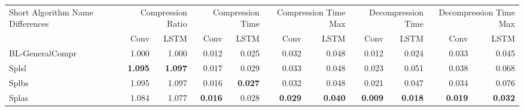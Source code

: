 \begin{tabular}{lrrrrrrrrrr}
\toprule
\multicolumn{1}{p{2.5cm}}{Short Algorithm Name Differences} & \multicolumn{2}{p{1.7cm}}{Compression Ratio} & \multicolumn{2}{p{1.7cm}}{Compression Time} & \multicolumn{2}{p{1.7cm}}{Compression Time Max} & \multicolumn{2}{p{1.7cm}}{Decompression Time} & \multicolumn{2}{p{1.7cm}}{Decompression Time Max} \\
 & Conv & LSTM & Conv & LSTM & Conv & LSTM & Conv & LSTM & Conv & LSTM \\
\midrule
BL-GeneralCompr & 1.000 & 1.000 & 0.012 & 0.025 & 0.032 & 0.048 & 0.012 & 0.024 & 0.033 & 0.045 \\
Splsl & \bfseries 1.095 & \bfseries 1.097 & 0.017 & 0.029 & 0.033 & 0.048 & 0.023 & 0.051 & 0.038 & 0.068 \\
Splbs & 1.095 & 1.097 & 0.016 & \bfseries 0.027 & 0.032 & 0.048 & 0.021 & 0.047 & 0.034 & 0.076 \\
Splas & 1.084 & 1.077 & \bfseries 0.016 & 0.028 & \bfseries 0.029 & \bfseries 0.040 & \bfseries 0.009 & \bfseries 0.018 & \bfseries 0.019 & \bfseries 0.032 \\
\bottomrule
\end{tabular}
